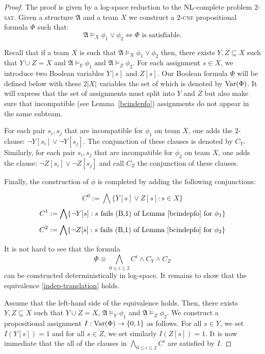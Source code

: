 \documentclass{article}
\theoremstyle{plain}
\theoremstyle{definition}
\newcommand{\mA}{{\mathfrak A}}
\newcommand{\Var}{{\rm Var}}
\newcommand{\nl}{{\rm NL}}
\newcommand{\pb}[1]{\textsc{#1}}
\begin{document}
\begin{proof} 
The proof is given by a log-space reduction to the $\nl$-complete problem $2$-\pb{sat}.
Given a structure $\mA$ and a  team $X$ we  construct a $2$-\pb{cnf} propositional formula $\Phi$ such that:
\begin{equation}\label{indep-translation}
 \mA \models_X \phi_1\vee \phi_2 \iff \Phi \mbox{ is satisfiable.} 
\end{equation}

 Recall that if a team $X$ is such that  $\mA \models_X \phi_1\vee \phi_2$ then, there exists $Y, Z\subseteq X$ such that $Y\cup Z=X$ and $\mA \models_Y \phi_1\mbox{ and } \mA \models_Z \phi_2$.
For each assignment $s\in X$, we introduce two Boolean variables $Y[s]$ and $Z[s]$. Our Boolean formula $\Phi$ will be defined below with these  $2|X|$ variables the set of which is denoted by $\Var(\Phi)$. It will express that the set of assignments must split into $Y$ and $Z$ but also make sure that incompatible (see Lemma~\ref{bcindepfo}) assignments do not appear in the same subteam. 
 
For each pair $s_i,s_j$ that are incompatible for $\phi_1$ on team $X$, one adds the $2$-clause: $\neg Y[s_i] \vee \neg Y[s_j]$. The conjunction of these clauses is denoted by $C_Y$.
Similarly, for each pair $s_i,s_j$ that are incompatible for $\phi_2$ on team $X$, one adds the clause: $\neg Z[s_i] \vee \neg Z[s_j]$ and call $C_Z$  the conjunction of these clauses.

Finally, the construction of $\phi$ is completed by adding the following conjunctions:

\[ C^0:= \bigwedge \{Y[s] \vee Z[s]:{s\in X}\} \]
\[ C^1:= \bigwedge\{ \neg Y[s]:{s \textrm{ fails (B,1) of Lemma \ref{bcindepfo}}  \textrm{ for } \phi_1} \}   \]
\[ C^2:= \bigwedge\{ \neg Z[s]:{s \textrm{ fails (B,1) of Lemma \ref{bcindepfo}}  \textrm{ for } \phi_2}\}   \]

It is not hard to see  that the  formula
 $$\Phi\equiv \bigwedge _{0\le i \le 2}C^i\wedge C_Y\wedge C_Z$$
  can be constructed deterministically in log-space.
 It remains to show that the equivalence \eqref{indep-translation} holds.
 
Assume that the left-hand side of the equivalence holds. Then, there exists $Y, Z\subseteq X$ such that $Y\cup Z=X$, $\mA \models_Y \phi_1$ and  $\mA \models_Z \phi_2$.
We construct a propositional assignment $I:\Var (\Phi)\rightarrow \{0,1\}$ as follows. For all $s\in Y$, we set $I(Y[s])=1$ and for all $s\in Z$, we set similarly $I(Z[s])=1$. It is now immediate that the all of the clauses in  $\bigwedge _{0\le i \le 2}C^i$ are satisfied by $I$.
 

\end{proof}
\end{document}
